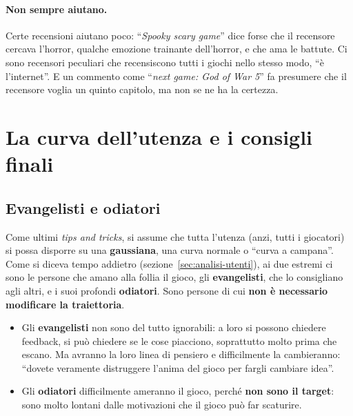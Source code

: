 \paragraph{Non sempre aiutano.} Certe recensioni aiutano poco: ``\emph{Spooky
scary game}'' dice forse che il recensore cercava l'horror, qualche emozione
trainante dell'horror, e che ama le battute. Ci sono recensori peculiari
che recensiscono tutti i giochi nello stesso modo, ``è l'internet''. E un
commento come ``\emph{next game: God of War 5}'' fa presumere che il
recensore voglia un quinto capitolo, ma non se ne ha la certezza.

\section{La curva dell'utenza e i consigli finali}
\label{gd10:sec:gaussiana}



\subsection{Evangelisti e odiatori}

Come ultimi \emph{tips and tricks}, si assume che tutta l'utenza (anzi, tutti
i giocatori) si possa disporre su una \textbf{gaussiana}, una curva normale o
``curva a campana''. Come si diceva tempo addietro
(sezione~\ref{sec:analisi-utenti}), ai due estremi ci sono le persone che
amano alla follia il gioco, gli \textbf{evangelisti}, che lo consigliano
agli altri, e i suoi profondi \textbf{odiatori}. Sono persone di cui
\textbf{non è necessario modificare la traiettoria}.
\begin{itemize}
  \item Gli \textbf{evangelisti} non sono del tutto ignorabili: a loro si
        possono chiedere feedback, si può chiedere se le cose piacciono,
        soprattutto molto prima che escano. Ma avranno la loro linea di
        pensiero e difficilmente la cambieranno: ``dovete veramente
        distruggere l'anima del gioco per fargli cambiare idea''.
  \item Gli \textbf{odiatori} difficilmente ameranno il gioco, perché
        \textbf{non sono il target}: sono molto lontani dalle motivazioni
        che il gioco può far scaturire.
\end{itemize}

